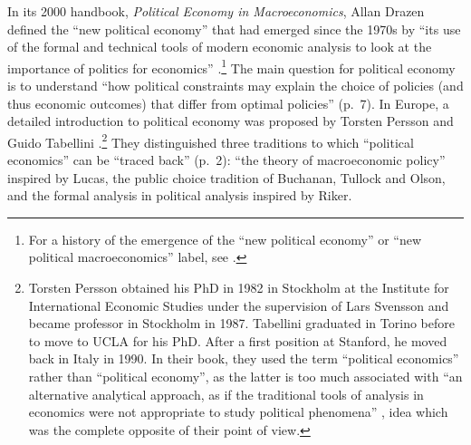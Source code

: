\documentclass[]{elsarticle} %
\begin{document}
In its 2000 handbook, \emph{Political Economy in Macroeconomics}, Allan
Drazen defined the ``new political economy'' that had emerged since the
1970s by ``its use of the formal and technical tools of modern economic
analysis to look at the importance of politics for economics''
\citep[4]{drazen2002}.\footnote{For a history of the emergence of the
  ``new political economy'' or ``new political macroeconomics'' label,
  see \citet{galvaodealmeida2021}.} The main question for political
economy is to understand ``how political constraints may explain the
choice of policies (and thus economic outcomes) that differ from optimal
policies'' (p.~7). In Europe, a detailed introduction to political
economy was proposed by Torsten Persson and Guido Tabellini
\citeyearpar{persson2002}.\footnote{Torsten Persson obtained his PhD in
  1982 in Stockholm at the Institute for International Economic Studies
  under the supervision of Lars Svensson and became professor in
  Stockholm in 1987. Tabellini graduated in Torino before to move to
  UCLA for his PhD. After a first position at Stanford, he moved back in
  Italy in 1990. In their book, they used the term ``political
  economics'' rather than ``political economy'', as the latter is too
  much associated with ``an alternative analytical approach, as if the
  traditional tools of analysis in economics were not appropriate to
  study political phenomena'' \citep[2]{persson2002}, idea which was the
  complete opposite of their point of view.} They distinguished three
traditions to which ``political economics'' can be ``traced back''
(p.~2): ``the theory of macroeconomic policy'' inspired by Lucas, the
public choice tradition of Buchanan, Tullock and Olson, and the formal
analysis in political analysis inspired by Riker.
\end{document}
